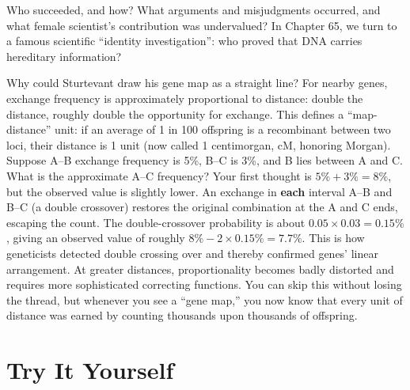 Who succeeded, and how? What arguments and misjudgments occurred, and what female scientist's contribution was undervalued? In Chapter 65, we turn to a famous scientific ``identity investigation'': who proved that DNA carries hereditary information?

\begin{tiaozhan}
Why could Sturtevant draw his gene map as a straight line? For nearby genes, exchange frequency is approximately proportional to distance: double the distance, roughly double the opportunity for exchange. This defines a ``map-distance'' unit: if an average of 1 in 100 offspring is a recombinant between two loci, their distance is 1 unit (now called 1 centimorgan, cM, honoring Morgan). Suppose A--B exchange frequency is 5\%, B--C is 3\%, and B lies between A and C. What is the approximate A--C frequency? Your first thought is $5\%+3\%=8\%$, but the observed value is slightly lower. An exchange in \textbf{each} interval A--B and B--C (a double crossover) restores the original combination at the A and C ends, escaping the count. The double-crossover probability is about $0.05 \times 0.03 = 0.15\%$, giving an observed value of roughly $8\% - 2\times0.15\% = 7.7\%$. This is how geneticists detected double crossing over and thereby confirmed genes' linear arrangement. At greater distances, proportionality becomes badly distorted and requires more sophisticated correcting functions. You can skip this without losing the thread, but whenever you see a ``gene map,'' you now know that every unit of distance was earned by counting thousands upon thousands of offspring.
\end{tiaozhan}

\section*{Try It Yourself}

